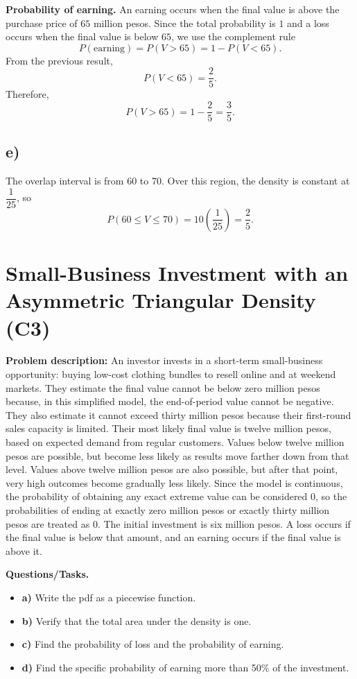 	\textbf{Probability of earning.}
	An earning occurs when the final value is above the purchase price of $65$ million pesos. Since the total probability is $1$ and a loss occurs when the final value is below $65$, we use the complement rule
	\[
	P(\text{earning})=P(V>65)=1-P(V<65).
	\]
	From the previous result,
	\[
	P(V<65)=\frac{2}{5}.
	\]
	Therefore,
	\[
	P(V>65)=1-\frac{2}{5}=\frac{3}{5}.
	\]
	
	\subsection*{e)}
	The overlap interval is from $60$ to $70$. Over this region, the density is constant at $\dfrac{1}{25}$, so
	\[
	P(60\le V\le 70)=10\left(\frac{1}{25}\right)=\frac{2}{5}.
	\]
	
	\section{Small-Business Investment with an Asymmetric Triangular Density (C3)}
	
	\textbf{Problem description:}
	An investor invests in a short-term small-business opportunity: buying low-cost clothing bundles to resell online and at weekend markets. They estimate the final value cannot be below zero million pesos because, in this simplified model, the end-of-period value cannot be negative. They also estimate it cannot exceed thirty million pesos because their first-round sales capacity is limited. Their most likely final value is twelve million pesos, based on expected demand from regular customers. Values below twelve million pesos are possible, but become less likely as results move farther down from that level. Values above twelve million pesos are also possible, but after that point, very high outcomes become gradually less likely. Since the model is continuous, the probability of obtaining any exact extreme value can be considered $0$, so the probabilities of ending at exactly zero million pesos or exactly thirty million pesos are treated as $0$. The initial investment is six million pesos. A loss occurs if the final value is below that amount, and an earning occurs if the final value is above it.
	
	\textbf{Questions/Tasks.}
	\begin{itemize}
		\item \textbf{a)} Write the pdf as a piecewise function.
		\item \textbf{b)} Verify that the total area under the density is one.
		\item \textbf{c)} Find the probability of loss and the probability of earning.
		\item \textbf{d)} Find the specific probability of earning more than 50\% of the investment.
	\end{itemize}
	
